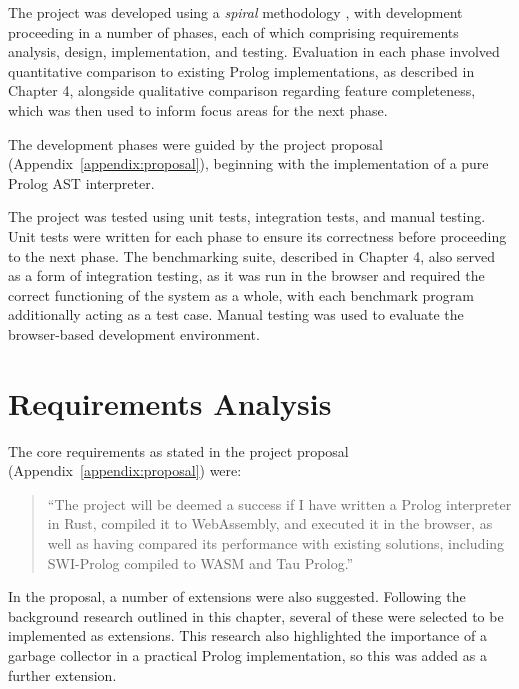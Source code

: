 \label{sec:dev-methodology}

The project was developed using a \emph{spiral} methodology \cite{boehmspiralmodelsoftware1986}, with development proceeding in a number of phases, each of which comprising requirements analysis, design, implementation, and testing. Evaluation in each phase involved quantitative comparison to existing Prolog implementations, as described in Chapter 4, alongside qualitative comparison regarding feature completeness, which was then used to inform focus areas for the next phase.

The development phases were guided by the project proposal (Appendix~\ref{appendix:proposal}), beginning with the implementation of a pure Prolog AST interpreter.

The project was tested using unit tests, integration tests, and manual testing. Unit tests were written for each phase to ensure its correctness before proceeding to the next phase. The benchmarking suite, described in Chapter 4, also served as a form of integration testing, as it was run in the browser and required the correct functioning of the system as a whole, with each benchmark program additionally acting as a test case. Manual testing was used to evaluate the browser-based development environment.

\section{Requirements Analysis}

\label{sec:requirements}

The core requirements as stated in the project proposal (Appendix~\ref{appendix:proposal}) were:

\vspace*{-1em}

\begin{quote}
``The project will be deemed a success if I have written a Prolog interpreter in Rust, compiled it to WebAssembly, and executed it in the browser, as well as having compared its performance with existing solutions, including SWI-Prolog compiled to WASM and Tau Prolog.''
\end{quote}

\vspace*{-1em}

In the proposal, a number of extensions were also suggested. Following the background research outlined in this chapter, several of these were selected to be implemented as extensions. This research also highlighted the importance of a garbage collector in a practical Prolog implementation, so this was added as a further extension.

